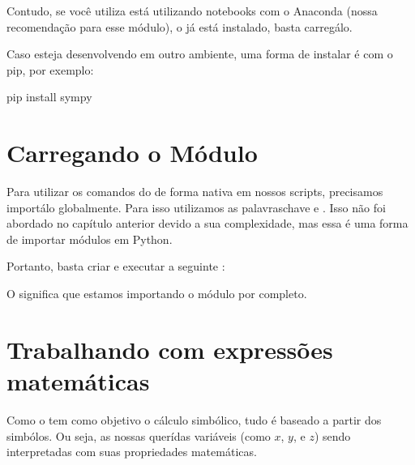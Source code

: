 \documentclass[letterpaper,10pt,english]{jupyterBook}
\begin{document}
\sphinxAtStartPar
Contudo, se você utiliza está utilizando notebooks com o Anaconda (nossa recomendação para esse módulo), o  já está instalado, basta carregá\sphinxhyphen{}lo.

\sphinxAtStartPar
Caso esteja desenvolvendo em outro ambiente, uma forma de instalar é com o pip, por exemplo:

\begin{sphinxVerbatim}[commandchars=\\\{\}]
pip install sympy
\end{sphinxVerbatim}


\section{Carregando o Módulo}
\label{\detokenize{chapters/3:carregando-o-modulo}}
\sphinxAtStartPar
Para utilizar os comandos do  de forma nativa em nossos scripts, precisamos importá\sphinxhyphen{}lo globalmente. Para isso utilizamos as palavras\sphinxhyphen{}chave  e . Isso não foi abordado no capítulo anterior devido a sua complexidade, mas essa é uma forma de importar módulos em Python.

\sphinxAtStartPar
Portanto, basta criar e executar a seguinte :

\begin{sphinxVerbatim}[commandchars=\\\{\}]
   
  
\end{sphinxVerbatim}

\sphinxAtStartPar
O \sphinxcode{\sphinxupquote{*}} significa que estamos importando o módulo por completo.


\section{Trabalhando com expressões matemáticas}
\label{\detokenize{chapters/3:trabalhando-com-expressoes-matematicas}}
\sphinxAtStartPar
Como o  tem como objetivo o cálculo simbólico, tudo é baseado a partir dos simbólos. Ou seja, as nossas querídas variáveis (como \(x\), \(y\), e \(z\)) sendo interpretadas com suas propriedades matemáticas.
\end{document}

